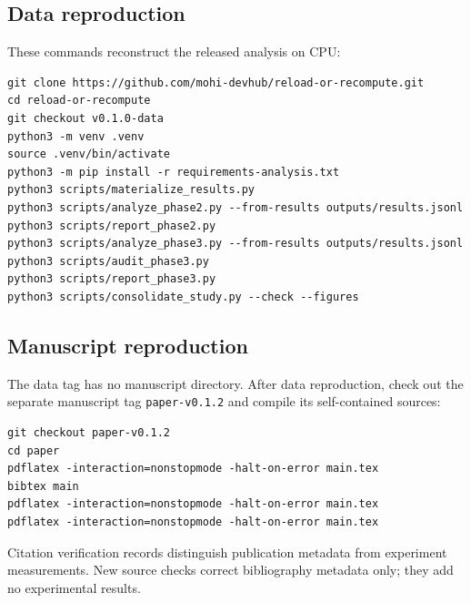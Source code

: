 \documentclass[10pt]{article}
\begin{document}
\subsection{Data reproduction}
These commands reconstruct the released analysis on CPU:
\begin{verbatim}
git clone https://github.com/mohi-devhub/reload-or-recompute.git
cd reload-or-recompute
git checkout v0.1.0-data
python3 -m venv .venv
source .venv/bin/activate
python3 -m pip install -r requirements-analysis.txt
python3 scripts/materialize_results.py
python3 scripts/analyze_phase2.py --from-results outputs/results.jsonl
python3 scripts/report_phase2.py
python3 scripts/analyze_phase3.py --from-results outputs/results.jsonl
python3 scripts/audit_phase3.py
python3 scripts/report_phase3.py
python3 scripts/consolidate_study.py --check --figures
\end{verbatim}
\subsection{Manuscript reproduction}
The data tag has no manuscript directory. After data reproduction, check out the separate manuscript tag \texttt{paper-v0.1.2} and compile its self-contained sources:
\begin{verbatim}
git checkout paper-v0.1.2
cd paper
pdflatex -interaction=nonstopmode -halt-on-error main.tex
bibtex main
pdflatex -interaction=nonstopmode -halt-on-error main.tex
pdflatex -interaction=nonstopmode -halt-on-error main.tex
\end{verbatim}
Citation verification records distinguish publication metadata from experiment measurements. New source checks correct bibliography metadata only; they add no experimental results.
\end{document}

